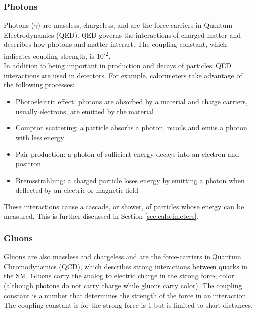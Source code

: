 
	\subsubsection{Photons}
	
	Photons ($\gamma$) are massless, chargeless, and are the force-carriers in Quantum Electrodynamics (QED).  QED governs the interactions of charged matter and describes how photons and matter interact.  The coupling constant, which indicates coupling strength, is 10\textsuperscript{-2}.\\
	
	In addition to being important in production and decays of particles, QED interactions are used in detectors.  For example, calorimeters take advantage of the following processes:
	
	\begin{itemize}
		\item Photoelectric effect: photons are absorbed by a material and charge carriers, usually electrons, are emitted by the material
		\item Compton scattering: a particle absorbs a photon, recoils and emits a photon with less energy
		\item Pair production: a photon of sufficient energy decays into an electron and positron
		\item Bremsstrahlung: a charged particle loses energy by emitting a photon when deflected by an electric or magnetic field
	\end{itemize}
	
	These interactions cause a cascade, or shower, of particles whose energy can be measured.  This is further discussed in Section \ref{sec:calorimeters}. \\
	
	\subsubsection{Gluons}
	
	Gluons are also massless and chargeless and are the force-carriers in Quantum Chromodynamics (QCD), which describes strong interactions between quarks in the SM.  Gluons carry the analog to electric charge in the strong force, color (although photons do not carry charge while gluons carry color).  The coupling constant is a number that determines the strength of the force in an interaction.  The coupling constant is for the strong force is 1 but is limited to short distances.  \\
	
